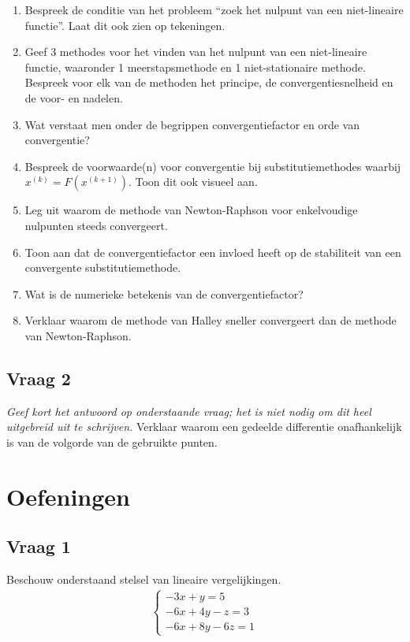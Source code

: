 \documentclass[kulak]{kulakarticle}
\begin{document}
	\begin{enumerate}
		\item Bespreek de conditie van het probleem ``zoek het nulpunt van een niet-lineaire functie''. Laat dit ook zien op tekeningen.
		\item Geef 3 methodes voor het vinden van het nulpunt van een niet-lineaire functie, waaronder 1 meerstapsmethode en 1 niet-stationaire methode. Bespreek voor elk van de methoden het principe, de convergentiesnelheid en de voor- en nadelen.
		\item Wat verstaat men onder de begrippen convergentiefactor en orde van convergentie?
		\item Bespreek de voorwaarde(n) voor convergentie bij substitutiemethodes waarbij \(x^{(k)}=F\left(x^{(k+1)}\right)\). Toon dit ook visueel aan.
		\item Leg uit waarom de methode van Newton-Raphson voor enkelvoudige nulpunten steeds convergeert.
		\item Toon aan dat de convergentiefactor een invloed heeft op de stabiliteit van een convergente substitutiemethode.
		\item Wat is de numerieke betekenis van de convergentiefactor?
		\item Verklaar waarom de methode van Halley sneller convergeert dan de methode van Newton-Raphson.
	\end{enumerate}

	\subsection*{Vraag 2}

	\textit{Geef kort het antwoord op onderstaande vraag; het is niet nodig om dit heel uitgebreid uit te schrijven.}
	Verklaar waarom een gedeelde differentie onafhankelijk is van de volgorde van de gebruikte punten.

	\newpage

	\section*{Oefeningen}

	\subsection*{Vraag 1}

	Beschouw onderstaand stelsel van lineaire vergelijkingen.
	\begin{align*}
		\begin{cases}
			-3x + y = 5\\
			-6x + 4y - z = 3\\
			-6x + 8y - 6z = 1
		\end{cases}
	\end{align*}
\end{document}

